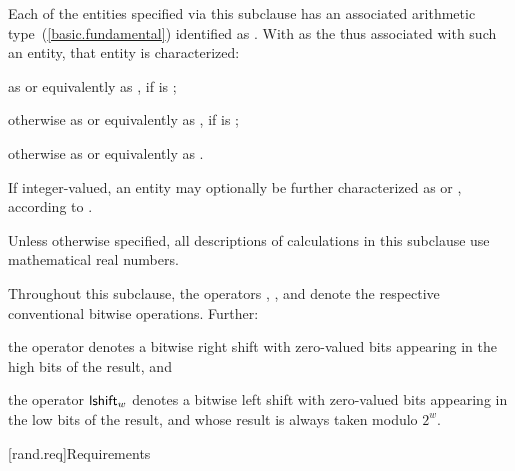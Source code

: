 \pnum
{}%
Each of the entities specified via this subclause
has an associated arithmetic type~(\ref{basic.fundamental})
identified as .
With  as the 
thus associated with such an entity,
that entity is characterized:
\begin{enumeratea}
 \item
   as  or equivalently as ,
   if  is ;
 \item
   otherwise
   as  or equivalently as ,
   if  is ;
 \item
   otherwise
   as  or equivalently as .
\end{enumeratea}
\noindent
If integer-valued,
an entity may optionally be further characterized as
 or ,
according to .

\pnum
Unless otherwise specified,
all descriptions of calculations
in this subclause
use mathematical real numbers.

\pnum
Throughout this subclause,
the operators
\bitand, \bitor, and \xor
denote the respective conventional bitwise operations.
Further:

\begin{enumeratea}
 \item
   the operator \rightshift\xspace
   denotes a bitwise right shift
   with zero-valued bits appearing in the high bits of the result,
 and
 \item
   the operator $ \mathbin{\mathsf{lshift}_{w}} $
   denotes a bitwise left shift
   with zero-valued bits appearing in the low bits of the result,
   and whose result is always taken modulo $2^w$.
\end{enumeratea}



[rand.req]{Requirements}%


